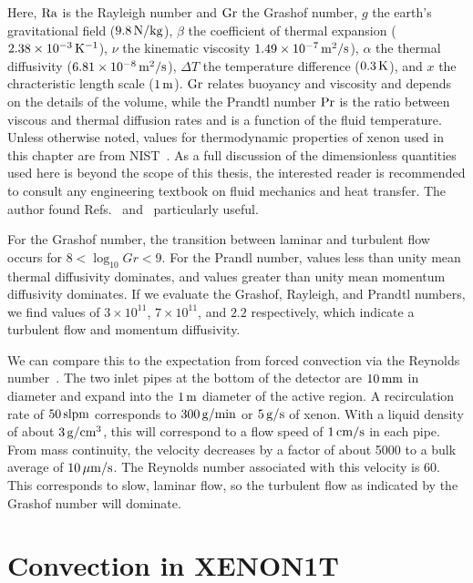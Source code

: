 Here, $\mathrm{Ra}$ is the Rayleigh number and $\mathrm{Gr}$ the Grashof number, $g$ the earth's gravitational field ($9.8\,\mathrm{N/kg}$), $\beta$ the coefficient of thermal expansion ($2.38\times10^{-3}\,\mathrm{K^{-1}}$), $\nu$ the kinematic viscosity $1.49\times10^{-7}\,\mathrm{m^2/s}$), $\alpha$ the thermal diffusivity ($6.81\times10^{-8}\,\mathrm{m^2/s}$), $\Delta T$ the temperature difference ($0.3\,\mathrm{K}$), and $x$ the chracteristic length scale ($1\,\mathrm{m}$). $\mathrm{Gr}$ relates buoyancy and viscosity and depends on the details of the volume, while the Prandtl number $\mathrm{Pr}$ is the ratio between viscous and thermal diffusion rates and is a function of the fluid temperature. Unless otherwise noted, values for thermodynamic properties of xenon used in this chapter are from NIST~\cite{NIST}. As a full discussion of the dimensionless quantities used here is beyond the scope of this thesis, the interested reader is recommended to consult any engineering textbook on fluid mechanics and heat transfer. The author found Refs.~\cite{Potter} and~\cite{Holman} particularly useful.

For the Grashof number, the transition between laminar and turbulent flow occurs for $8 < \log_{10}Gr < 9$. For the Prandl number, values less than unity mean thermal diffusivity dominates, and values greater than unity mean momentum diffusivity dominates. If we evaluate the Grashof, Rayleigh, and Prandtl numbers, we find values of $3\times10^{11}$, $7\times10^{11}$, and $2.2$ respectively, which indicate a turbulent flow and momentum diffusivity.

We can compare this to the expectation from forced convection via the Reynolds number~\cite{Stokes}. The two inlet pipes at the bottom of the detector are $10\,\mathrm{mm}$ in diameter and expand into the $1\,\mathrm{m}$ diameter of the active region. A recirculation rate of $50\,\mathrm{slpm}$ corresponds to $300\,\mathrm{g/min}$ or $5\,\mathrm{g/s}$ of xenon. With a liquid density of about $3\,\mathrm{g/cm^3}$, this will correspond to a flow speed of $1\,\mathrm{cm/s}$ in each pipe. From mass continuity, the velocity decreases by a factor of about 5000 to a bulk average of $10\,\mathrm{\mu m/s}$. The Reynolds number associated with this velocity is $60$. This corresponds to slow, laminar flow, so the turbulent flow as indicated by the Grashof number will dominate.

\section{Convection in XENON1T}~\label{sec:convection}


